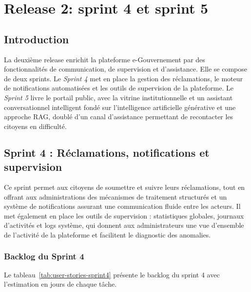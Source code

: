 \chapter{Release 2: sprint 4 et sprint 5}

\section{Introduction}
La deuxième release enrichit la plateforme e-Gouvernement par des fonctionnalités de communication, de supervision et d'assistance. Elle se compose de deux sprints. Le \textit{Sprint 4} met en place la gestion des réclamations, le moteur de notifications automatisées et les outils de supervision de la plateforme. Le \textit{Sprint 5} livre le portail public, avec la vitrine institutionnelle et un assistant conversationnel intelligent fondé sur l'intelligence artificielle générative et une approche RAG, doublé d'un canal d'assistance permettant de recontacter les citoyens en difficulté.


\section{Sprint 4 : Réclamations, notifications et supervision}

Ce sprint permet aux citoyens de soumettre et suivre leurs réclamations, tout en offrant aux administrations des mécanismes de traitement structurés et un système de notifications assurant une communication fluide entre les acteurs. Il met également en place les outils de supervision : statistiques globales, journaux d'activités et logs système, qui donnent aux administrateurs une vue d'ensemble de l'activité de la plateforme et facilitent le diagnostic des anomalies.

\subsection{Backlog du Sprint 4}

Le tableau~\ref{tab:user-stories-sprint4}  présente le backlog du  sprint 4 avec l'estimation en jours de chaque tâche.

\renewcommand{\arraystretch}{1.3}

